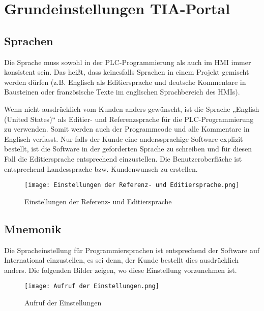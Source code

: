 \chapter{Grundeinstellungen TIA-Portal}\label{chap:Grundeinstellungen TIA-Portal}

\section{Sprachen}\label{subsec:Sprachen}
Die Sprache muss sowohl in der PLC-Programmierung als auch im HMI immer konsistent sein. Das heißt, dass keinesfalls Sprachen in einem Projekt gemischt werden dürfen (z.B. Englisch als Editiersprache und deutsche Kommentare in Bausteinen oder französische Texte im englischen Sprachbereich des HMIs). \par
\noindent Wenn nicht ausdrücklich vom Kunden anders gewünscht, ist die Sprache „English (United States)“ als Editier- und Referenzsprache für die PLC-Programmierung zu verwenden. Somit werden auch der Programmcode und alle Kommentare in Englisch verfasst. Nur falls der Kunde eine anderssprachige Software explizit bestellt, ist die Software in der geforderten Sprache zu schreiben und für diesen Fall die Editiersprache entsprechend einzustellen. Die Benutzeroberfläche ist entsprechend Landessprache bzw. Kundenwunsch zu erstellen. 

\begin{figure}[!ht]
    \centering
    \texttt{[image: Einstellungen der Referenz- und Editiersprache.png]}
    \caption{Einstellungen der Referenz- und Editiersprache}
    \label{fig:Einstellungen der Referenz- und Editiersprache}
\end{figure}

\clearpage

\section{Mnemonik}\label{subsec:Mnemonik}

Die Spracheinstellung für Programmiersprachen ist entsprechend der Software auf International einzustellen, es sei denn, der Kunde bestellt dies ausdrücklich anders. Die folgenden Bilder zeigen, wo diese Einstellung vorzunehmen ist.

\begin{figure}[!ht]
    \centering
    \texttt{[image: Aufruf der Einstellungen.png]}
    \caption{Aufruf der Einstellungen}
    \label{fig:Aufruf der Einstellungen}
\end{figure}


